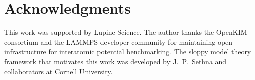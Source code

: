 \documentclass[twocolumn,10pt]{article}
\begin{document}
\section*{Acknowledgments}

This work was supported by Lupine Science. The author thanks the OpenKIM consortium and the LAMMPS developer community for maintaining open infrastructure for interatomic potential benchmarking. The sloppy model theory framework that motivates this work was developed by J.~P.~Sethna and collaborators at Cornell University.



\end{document}

